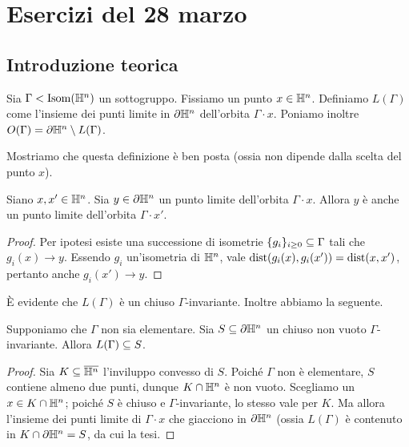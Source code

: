 \section*{Esercizi del 28 marzo}
\subsection*{Introduzione teorica}
\begin{definition*}
Sia $\Gamma<\operatorname{Isom}(\mathbb{H}^n)$ un sottogruppo. Fissiamo un punto $x\in\mathbb{H}^n$. Definiamo $L(\Gamma)$ come l'insieme dei punti limite in $\partial\mathbb{H}^n$ dell'orbita $\Gamma\cdot x$. Poniamo inoltre $O(\Gamma)=\partial\mathbb{H}^n\setminus L(\Gamma)$.
\end{definition*}

Mostriamo che questa definizione è ben posta (ossia non dipende dalla scelta del punto $x$).
\begin{proposition*}
Siano $x,x'\in\mathbb{H}^n$. Sia $y\in\partial\mathbb{H}^n$ un punto limite dell'orbita $\Gamma\cdot x$. Allora $y$ è anche un punto limite dell'orbita $\Gamma\cdot x'$.
\end{proposition*}
\begin{proof}
Per ipotesi esiste una successione di isometrie $\{g_i\}_{i\ge 0}\subseteq\Gamma$ tali che $g_i(x)\to y$. Essendo $g_i$ un'isometria di $\mathbb{H}^n$, vale $\operatorname{dist}(g_i(x),g_i(x'))=\operatorname{dist}(x,x')$, pertanto anche $g_i(x')\to y$.
\end{proof}

È evidente che $L(\Gamma)$ è un chiuso $\Gamma$-invariante. Inoltre abbiamo la seguente.
\begin{proposition*}
Supponiamo che $\Gamma$ non sia elementare. Sia $S\subseteq\partial\mathbb{H}^n$ un chiuso non vuoto $\Gamma$-invariante. Allora $L(\Gamma)\subseteq S$.
\end{proposition*}
\begin{proof}
Sia $K\subseteq\overline{\mathbb{H}^n}$ l'inviluppo convesso di $S$. Poiché $\Gamma$ non è elementare, $S$ contiene almeno due punti, dunque $K\cap\mathbb{H}^n$ è non vuoto. Scegliamo un $x\in K\cap\mathbb{H}^n$; poiché $S$ è chiuso e $\Gamma$-invariante, lo stesso vale per $K$. Ma allora l'insieme dei punti limite di $\Gamma\cdot x$ che giacciono in $\partial\mathbb{H}^n$ (ossia $L(\Gamma)$ è contenuto in $K\cap\partial\mathbb{H}^n=S$, da cui la tesi.
\end{proof}

